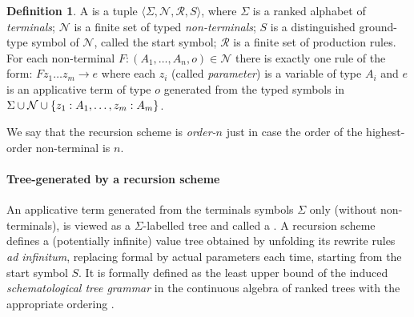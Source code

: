 \documentclass[a4paper]{article}[12pt]
\theoremstyle{remark}
\theoremstyle{definition}
\newtheorem{definition}{Definition}[section]
\begin{document}
\begin{definition}
	A  is a tuple $\langle
	\Sigma, \mathcal{N}, \mathcal{R}, S \rangle$, where $\Sigma$ is a
		ranked alphabet of \emph{terminals};
		$\mathcal{N}$ is a finite set of typed \emph{non-terminals};
		$S$ is a distinguished ground-type symbol of
		$\mathcal{N}$, called the start symbol;
		$\mathcal{R}$ is a finite set of production rules.
		For each non-terminal $F : (A_1, \ldots, A_n, o) \in \mathcal{N}$ there is exactly one rule of the form:
		$ F z_1 \ldots z_m \rightarrow e$
		where each $z_i$ (called \emph{parameter}) is a
		variable of type $A_i$ and $e$ is an applicative term of type $o$
		generated from the typed symbols in $\Sigma \cup \mathcal{N} \cup \{z_1:A_1, \ldots, z_m:A_m \}$.

	We say that the recursion scheme is \emph{order-$n$} just in case the order of the highest-order non-terminal is $n$.

\end{definition}

\paragraph{Tree-generated by a recursion scheme}
An applicative term generated from the terminals symbols $\Sigma$ only (without non-terminals), is viewed as a $\Sigma$-labelled tree and called a . A recursion scheme defines a (potentially infinite) value tree obtained by unfolding its rewrite rules \emph{ad infinitum}, replacing formal by actual parameters each time, starting from the start symbol $S$. It is formally defined as the least upper bound of the
induced \emph{schematological tree grammar} in the continuous algebra of ranked trees with the appropriate ordering \cite{KNU02,demirandathesis}.
\end{document}

